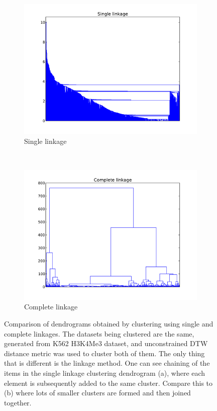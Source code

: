 \documentclass[parskip]{cs4rep}
\newcommand{\histonemodification}[1]{#1}
\newcommand{\celltype}[1]{#1}
\begin{document}
\begin{figure}
    \centering
    \begin{subfigure}[b]{0.45\textwidth}
        \centering
        \includegraphics[width=\textwidth]{figures/clustering/linkage_single.pdf}
        \caption{Single linkage}
        \label{fig:clustering:dendrogram:single}
    \end{subfigure}
    ~
    \begin{subfigure}[b]{0.45\textwidth}
        \centering
        \includegraphics[width=\textwidth]{figures/clustering/linkage_complete.pdf}
        \caption{Complete linkage}
        \label{fig:clustering:dendrogram:complete}
    \end{subfigure}
    \caption{Comparison of dendrograms obtained by clustering using single and complete linkages. The datasets being clustered are the same, generated from \celltype{K562} \histonemodification{H3K4Me3} dataset, and unconstrained DTW distance metric was used to cluster both of them. The only thing that is different is the linkage method.
      One can see chaining of the items in the single linkage clustering  dendrogram (a), where each element is subsequently added to the same cluster. Compare this to (b) where lots of smaller clusters are formed and then joined together.}
    \label{fig:clustering:dendrogram}
\end{figure}
\end{document}
